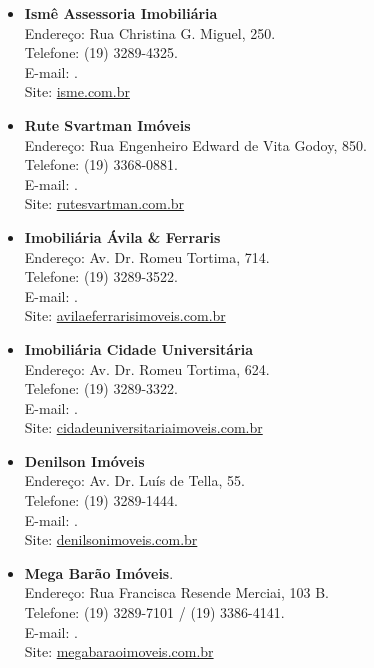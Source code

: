 \begin{itemize}
\item   \textbf{Ismê Assessoria Imobiliária}
		\\Endereço: Rua Christina G. Miguel, 250.
		\\Telefone: (19) 3289-4325.
		\\E-mail: .
		\\Site: \url{isme.com.br}

\item   \textbf{Rute Svartman Imóveis}
		\\Endereço: Rua Engenheiro Edward de Vita Godoy, 850.
		\\Telefone: (19) 3368-0881.
		\\E-mail: .
		\\Site: \url{rutesvartman.com.br}

\item   \textbf{Imobiliária Ávila \& Ferraris}
		\\Endereço: Av. Dr. Romeu Tortima, 714.
		\\Telefone: (19) 3289-3522.
		\\E-mail: .
		\\Site: \url{avilaeferrarisimoveis.com.br}

\item   \textbf{Imobiliária Cidade Universitária}
		\\Endereço: Av. Dr. Romeu Tortima, 624.
		\\Telefone: (19) 3289-3322.
		\\E-mail: .
		\\Site: \url{cidadeuniversitariaimoveis.com.br}

\item   \textbf{Denilson Imóveis}
		\\Endereço: Av. Dr. Luís de Tella, 55.
		\\Telefone: (19) 3289-1444.
		\\E-mail: .
		\\Site: \url{denilsonimoveis.com.br}

\item   \textbf{Mega Barão Imóveis}.
		\\Endereço: Rua Francisca Resende Merciai, 103 B.
		\\Telefone: (19) 3289-7101 / (19) 3386-4141.
		\\E-mail: .
		\\Site: \url{megabaraoimoveis.com.br}


\end{itemize}

